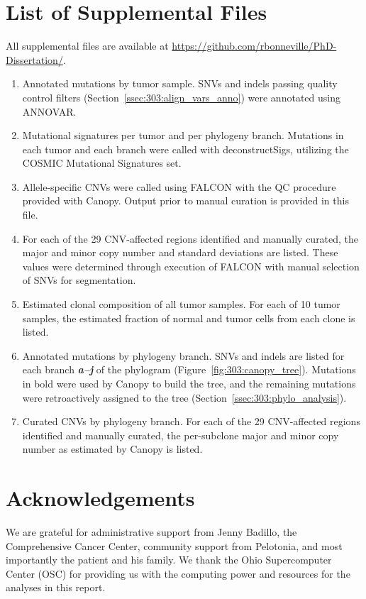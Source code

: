 \section{List of Supplemental Files}
All supplemental files are available at \url{https://github.com/rbonneville/PhD-Dissertation/}.
\begin{enumerate}
    \renewcommand*{\labelenumi}{S\thechapter{}.\arabic{enumi}. }
    \item Annotated mutations by tumor sample. SNVs and indels passing quality control filters (Section~\ref{ssec:303:align_vars_anno}) were annotated using ANNOVAR.
    \item Mutational signatures per tumor and per phylogeny branch. Mutations in each tumor and each branch were called with deconstructSigs, utilizing the COSMIC Mutational Signatures set.
    \item Allele-specific CNVs were called using FALCON with the QC procedure provided with Canopy. Output prior to manual curation is provided in this file.
    \item For each of the 29 CNV-affected regions identified and manually curated, the major and minor copy number and standard deviations are listed. These values were determined through execution of FALCON with manual selection of SNVs for segmentation.
    \item Estimated clonal composition of all tumor samples. For each of 10 tumor samples, the estimated fraction of normal and tumor cells from each clone is listed.
    \item Annotated mutations by phylogeny branch. SNVs and indels are listed for each branch \textbf{\textit{a--j}} of the phylogram (Figure~\ref{fig:303:canopy_tree}). Mutations in bold were used by Canopy to build the tree, and the remaining mutations were retroactively assigned to the tree (Section~\ref{ssec:303:phylo_analysis}).
    \item Curated CNVs by phylogeny branch. For each of the 29 CNV-affected regions identified and manually curated, the per-subclone major and minor copy number as estimated by Canopy is listed.
\end{enumerate}

\section*{Acknowledgements}
We are grateful for administrative support from Jenny Badillo, the Comprehensive Cancer Center, community support from Pelotonia, and most importantly the patient and his family. We thank the Ohio Supercomputer Center (OSC) for providing us with the computing power and resources for the analyses in this report.
